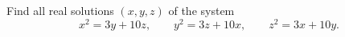 Find all real solutions $(x,y,z)$ of the system
\[x^2=3y+10z,\qquad y^2=3z+10x,\qquad z^2=3x+10y.\]
